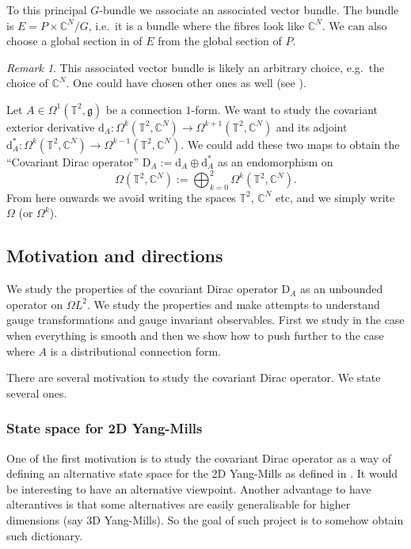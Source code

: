 \documentclass[12pt]{article}
\numberwithin{equation}{section}
\theoremstyle{definition}
\theoremstyle{remark}
\newtheorem{remark}[theorem]{Remark}
\newcommand{\diff}{\mathrm{d}}
\newcommand{\1}{\mathbf 1}
\newcommand{\<}{\langle}
\renewcommand{\>}{\rangle}
\newcommand{\rmD}{\mathrm{D}}
\newcommand{\fg}{\mathfrak g}
\newcommand{\bC}{\mathbb C}
\newcommand{\bT}{\mathbb T}
\begin{document}
To this principal $G$-bundle we associate an associated vector bundle. The bundle is $E=P\times \bC^N/G$, i.e.\ it is a bundle where the fibres look like $\bC^N$. We can also choose a global section in of $E$ from the global section of $P$.  


\begin{remark}
    This associated vector bundle is likely an arbitrary choice, e.g.\ the choice of $\bC^N$. One could have chosen other ones as well (see ).
\end{remark}

Let $A\in\Omega^1(\bT^2,\fg)$ be a connection $1$-form. We want to study the covariant exterior derivative $\diff_A:\Omega^k(\bT^2,\bC^N)\to \Omega^{k+1}(\bT^2,\bC^N)$ and its adjoint $\diff^*_A:\Omega^k(\bT^2,\bC^N)\to \Omega^{k-1}(\bT^2,\bC^N)$. We could add these two maps to obtain the ``Covariant Dirac operator'' $\rmD_A:= \diff_A\oplus\diff_A^*$ as an endomorphism on 
\[
\Omega(\bT^2,\bC^N):=\bigoplus_{k=0}^2 \Omega^k(\bT^2,\bC^N).
\]
From here onwards we avoid writing the spaces $\bT^2$, $\bC^N$ etc, and we simply write $\Omega$ (or $\Omega^k$). 




\subsection{Motivation and directions}
We study the properties of the covariant Dirac operator $\rmD_A$ as an unbounded operator on $\Omega L^2$. We study the properties and make attempts to understand gauge transformations and gauge invariant observables. First we study in the case when everything is smooth and then we show how to push further to the case where $A$ is a distributional connection form.  

There are several motivation to study the covariant Dirac operator. We state several ones.

\subsubsection{State space for 2D Yang-Mills}
One of the first motivation is to study the covariant Dirac operator as a way of defining an alternative state space for the 2D Yang-Mills as defined in \cite{CCHS2d}. It would be interesting to have an alternative viewpoint. Another advantage to have alterantives is that some alternatives are easily generalisable for higher dimensions (say 3D Yang-Mills). So the goal of such project is to somehow obtain such dictionary. 
\end{document}
